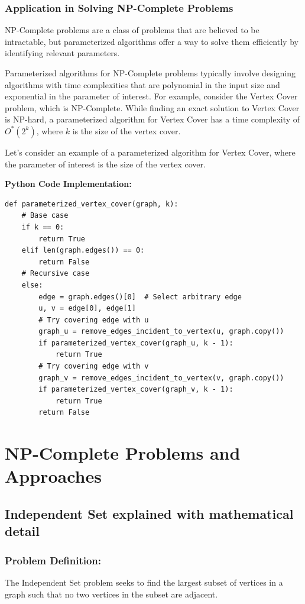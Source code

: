 \documentclass[12pt]{book} %
\begin{document}
\subsubsection{Application in Solving NP-Complete Problems}

NP-Complete problems are a class of problems that are believed to be intractable, but parameterized algorithms offer a way to solve them efficiently by identifying relevant parameters.

Parameterized algorithms for NP-Complete problems typically involve designing algorithms with time complexities that are polynomial in the input size and exponential in the parameter of interest. For example, consider the Vertex Cover problem, which is NP-Complete. While finding an exact solution to Vertex Cover is NP-hard, a parameterized algorithm for Vertex Cover has a time complexity of \(O^*(2^k)\), where \(k\) is the size of the vertex cover.

Let's consider an example of a parameterized algorithm for Vertex Cover, where the parameter of interest is the size of the vertex cover.

\textbf{Python Code Implementation:}
\FloatBarrier
\begin{lstlisting}
def parameterized_vertex_cover(graph, k):
    # Base case
    if k == 0:
        return True
    elif len(graph.edges()) == 0:
        return False
    # Recursive case
    else:
        edge = graph.edges()[0]  # Select arbitrary edge
        u, v = edge[0], edge[1]
        # Try covering edge with u
        graph_u = remove_edges_incident_to_vertex(u, graph.copy())
        if parameterized_vertex_cover(graph_u, k - 1):
            return True
        # Try covering edge with v
        graph_v = remove_edges_incident_to_vertex(v, graph.copy())
        if parameterized_vertex_cover(graph_v, k - 1):
            return True
        return False
\end{lstlisting}
\FloatBarrier


\section{NP-Complete Problems and Approaches}

\subsection{Independent Set explained with mathematical detail}

\subsubsection{Problem Definition:} 
The Independent Set problem seeks to find the largest subset of vertices in a graph such that no two vertices in the subset are adjacent.
\end{document}
